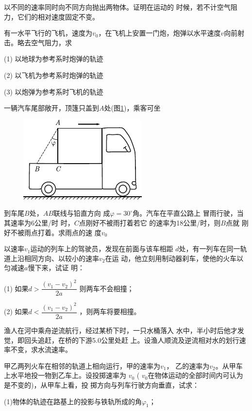 \begin{exercises}

\exercise 以不同的速率同时向不同方向抛出两物体。证明在运动的
时候，若不计空气阻力，它们的相对速度固定不变。

\exercise 有一水平飞行的飞机，速度为$ v _ { 0 }$，在飞机上安置一门炮，炮弹以水平速度$ v $向前射击。略去空气阻力，求

(1) 以地球为参考系时炮弹的轨迹

(2) 以飞机为参考系时炮弹的轨迹

(3) 以炮弹为参考系时飞机的轨迹

\exercise 一辆汽车尾部敞开，顶篷只盖到$A$处(图\ref{fig:02.17})，乘客可坐
\begin{figure}
    \includegraphics{figure/fig02.17}
    \caption{}
    \label{fig:02.17}
\end{figure}
到车尾$B$处，$AB$联线与铅直方向
成$ \varphi = 3 0 ^ { \circ }  $角。汽车在平直公路上
冒雨行驶，当其速率为6公里/时
时，$C$点刚好不被雨打着若它
的速率为18公里/时，则$B$点就
刚好不被雨点打着。求雨点的速
度$ v _ { 0 }$

\exercise 以速率$ v _ { 1 }  $运动的列车上的驾驶员，发现在前面与该车相距
$d$处，有一列车在同一轨道上沿相同方向、以较小的速率$v_2$在运
动，他立刻用制动器刹车，使他的火车以匀减速$a$慢下来，试证
明：

(1) 如果$d > \dfrac { ( v _ { 1 } - v _ { 2 } ) ^ { 2 } } { 2 a }$
则两车不会相撞；

(2) 如果$d < \dfrac { ( v _ { 1 } - v _ { 2 } ) ^ { 2 } } { 2 a }$
，则两车将要相撞。

\exercise 渔人在河中乘舟逆流航行，经过某桥下时，一只水桶落入
水中，半小时后他才发觉，即回头追赶，在桥的下游5.0公里处赶
上。设渔人顺流及逆流相对水的划行速率不变，求水流速率。

\exercise 甲乙两列火车在相邻的轨道上相向运行，甲的速率为$v_1$，
乙的速率为$v_2$。从甲车上水平地投一物到乙车上。设投掷速率为
$v _ { 0 }$ ( $v_0  $在物体运动的全部时间内可认为是不变的)，从甲车上看，投
掷方向与列车行驶方向垂直，试求：

(1)物体的轨迹在路基上的投影与铁轨所成的角$ \varphi _1 $；


\end{exercises}
